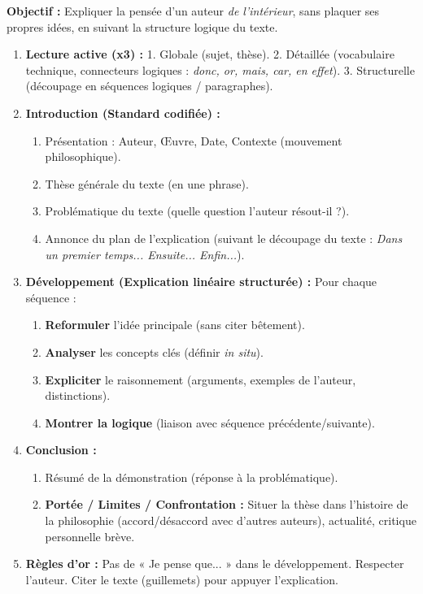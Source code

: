 \documentclass[11pt]{article}
\begin{document}
\begin{methode}
\textbf{Objectif :} Expliquer la pensée d'un auteur \emph{de l'intérieur}, sans plaquer ses propres idées, en suivant la structure logique du texte.
\begin{enumerate}
    \item \textbf{Lecture active (x3) :} 1. Globale (sujet, thèse). 2. Détaillée (vocabulaire technique, connecteurs logiques : \emph{donc, or, mais, car, en effet}). 3. Structurelle (découpage en séquences logiques / paragraphes).
    \item \textbf{Introduction (Standard codifiée) :}
    \begin{enumerate}
        \item Présentation : Auteur, Œuvre, Date, Contexte (mouvement philosophique).
        \item Thèse générale du texte (en une phrase).
        \item Problématique du texte (quelle question l'auteur résout-il ?).
        \item Annonce du plan de l'explication (suivant le découpage du texte : \emph{Dans un premier temps... Ensuite... Enfin...}).
    \end{enumerate}
    \item \textbf{Développement (Explication linéaire structurée) :} Pour chaque séquence :
    \begin{enumerate}
        \item \textbf{Reformuler} l'idée principale (sans citer bêtement).
        \item \textbf{Analyser} les concepts clés (définir \emph{in situ}).
        \item \textbf{Expliciter} le raisonnement (arguments, exemples de l'auteur, distinctions).
        \item \textbf{Montrer la logique} (liaison avec séquence précédente/suivante).
    \end{enumerate}
    \item \textbf{Conclusion :}
    \begin{enumerate}
        \item Résumé de la démonstration (réponse à la problématique).
        \item \textbf{Portée / Limites / Confrontation :} Situer la thèse dans l'histoire de la philosophie (accord/désaccord avec d'autres auteurs), actualité, critique personnelle brève.
    \end{enumerate}
    \item \textbf{Règles d'or :} Pas de « Je pense que... » dans le développement. Respecter l'auteur. Citer le texte (guillemets) pour appuyer l'explication.
\end{enumerate}
\end{methode}
\end{document}
